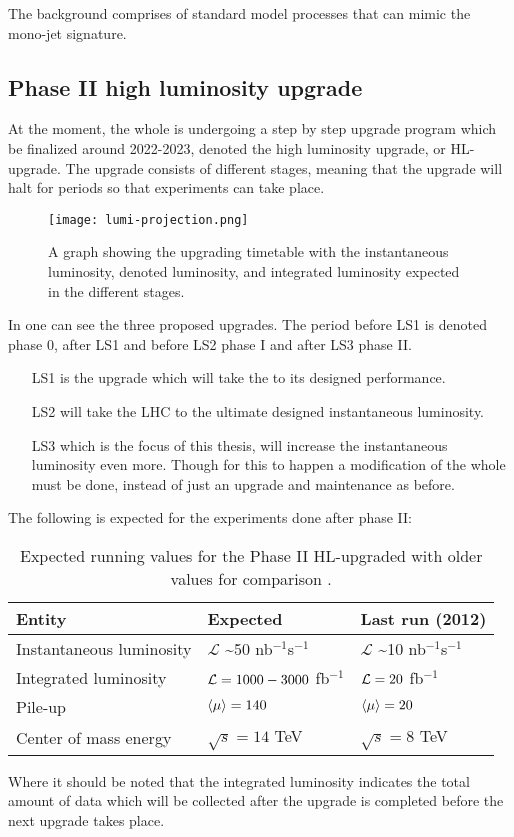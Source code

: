 The background comprises of standard model processes that can mimic the mono-jet signature.
\subsection{Phase II high luminosity upgrade}\label{sec:eo:subsec:hlu}
At the moment, the whole \abbrLHC is undergoing a step by step upgrade program which be finalized around 2022-2023, denoted the high luminosity upgrade, or HL-upgrade. The upgrade consists of different stages, meaning that the upgrade will halt for periods so that experiments can take place. 
\begin{figure}[ht]
\texttt{[image: lumi-projection.png]}
\caption{A graph showing the upgrading timetable with the instantaneous luminosity, denoted luminosity, and integrated luminosity expected in the different stages.}
\label{fig:upgt}
\end{figure}
In  one can see the three proposed upgrades. The period before LS1 is denoted phase 0, after LS1 and before LS2 phase I and after LS3 phase II. 
\begin{itemize}
\item[LS1] is the upgrade which will take the \abbrLHC to its designed performance. 

\item[LS2] will take the LHC to the ultimate designed instantaneous luminosity. 
\item[LS3] which is the focus of this thesis, will increase the instantaneous luminosity even more. Though for this to happen a modification of the whole \abbrLHC must be done, instead of just an upgrade and maintenance as before.
\end{itemize}
The following is expected for the experiments done after phase II:
\renewcommand{\arraystretch}{1.5} %
\begin{table}[H]
\begin{center}
    \begin{tabular}{ | l | l | l |}
    \hline
    Entity & Expected & Last run (2012) \\ \hline
    Instantaneous luminosity & $\mathscr{L}$ \textasciitilde 50 nb$^{-1}$s$^{-1}$ & $\mathscr{L}$ \textasciitilde 10 nb$^{-1}$s$^{-1}$ \\ \hline  
    Integrated luminosity & $\mathcal{L}=1000-3000$ fb$^{-1}$ & $\mathcal{L}=20$ fb$^{-1}$ \\ \hline
  	Pile-up & $\left<\mu\right>=140$ & $\left<\mu\right>=20$ \\ \hline
  	Center of mass energy & $\sqrt{s}=14$ TeV &  $\sqrt{s}=8$ TeV \\ \hline
  	\end{tabular}
  	
  	\caption{Expected running values for the Phase II HL-upgraded \abbrLHC with older values for comparison \citep{HL:2013}.}
  	\label{tab:expectvalues}
  	\end{center}
    \end{table}
    \renewcommand{\arraystretch}{1.0}  %
Where it should be noted that the integrated luminosity indicates the total amount of data which will be collected after the upgrade is completed before the next upgrade takes place. 

